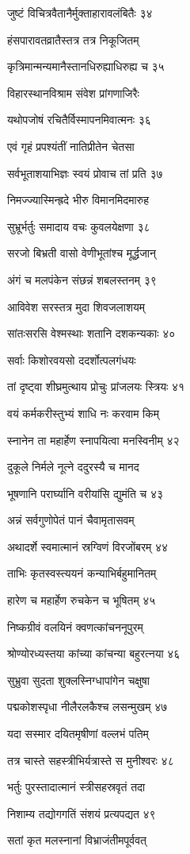 जुष्टं विचित्रवैतानैर्मुक्ताहारावलंबितैः ३४

हंसपारावतव्रातैस्तत्र तत्र निकूजितम्

कृत्रिमान्मन्यमानैस्तानधिरुह्याधिरुह्य च ३५

विहारस्थानविश्राम संवेश प्रांगणाजिरैः

यथोपजोषं रचितैर्विस्मापनमिवात्मनः ३६

एवं गृहं प्रपश्यंतीं नातिप्रीतेन चेतसा

सर्वभूताशयाभिज्ञः स्वयं प्रोवाच तां प्रति ३७

निमज्ज्यास्मिन्ह्रदे भीरु विमानमिदमारुह

सुभ्रूर्भर्तुः समादाय वचः कुवलयेक्षणा ३८

सरजो बिभ्रती वासो वेणीभूतांश्च मूर्द्धजान्

अंगं च मलपंकेन संछन्नं शबलस्तनम् ३९

आविवेश सरस्तत्र मुदा शिवजलाशयम्

सांतःसरसि वेश्मस्थाः शतानि दशकन्यकाः ४०

सर्वाः किशोरवयसो ददर्शोत्पलगंधयः

तां दृष्ट्वा शीघ्रमुत्थाय प्रोचुः प्रांजलयः स्त्रियः ४१

वयं कर्मकरीस्तुभ्यं शाधि नः करवाम किम्

स्नानेन ता महार्हेण स्नापयित्वा मनस्विनीम् ४२

दुकूले निर्मले नूत्ने ददुरस्यै च मानद

भूषणानि परार्घ्यानि वरीयांसि द्युमंति च ४३

अन्नं सर्वगुणोपेतं पानं चैवामृतासवम्

अथादर्शे स्वमात्मानं स्रग्विणं विरजोंबरम् ४४

ताभिः कृतस्वस्त्ययनं कन्याभिर्बहुमानितम्

हारेण च महार्हेण रुचकेन च भूषितम् ४५

निष्कग्रीवं वलयिनं क्वणत्कांचननूपुरम्

श्रोण्योरध्यस्तया कांच्या कांचन्या बहुरत्नया ४६

सुभ्रुवा सुदता शुक्लस्निग्धापांगेन चक्षुषा

पद्मकोशस्पृधा नीलैरलकैश्च लसन्मुखम् ४७

यदा सस्मार दयितमृषीणां वल्लभं पतिम्

तत्र चास्ते सहस्त्रीभिर्यत्रास्ते स मुनीश्वरः ४८

भर्तुः पुरस्तादात्मानं स्त्रीसहस्रवृतं तदा

निशाम्य तद्योगगतिं संशयं प्रत्यपद्यत ४९

सतां कृत मलस्नानां विभ्राजंतीमपूर्ववत्

